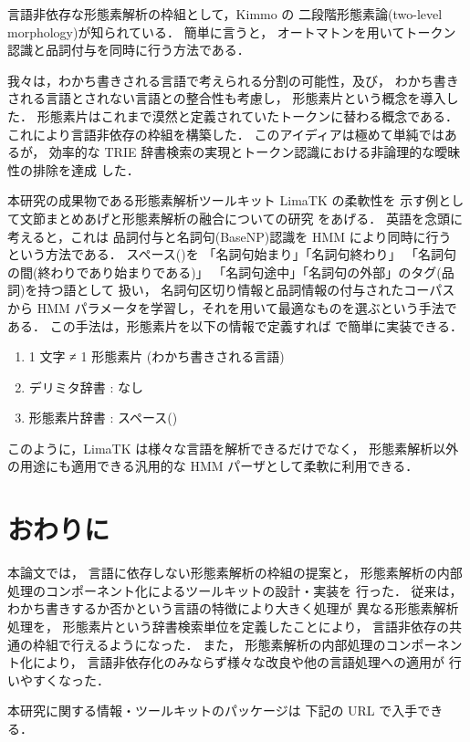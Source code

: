 言語非依存な形態素解析の枠組として，Kimmo の
二段階形態素論(two-level morphology)\cite{Kimmo83}が知られている．
簡単に言うと，
オートマトンを用いてトークン認識と品詞付与を同時に行う方法である．

我々は，わかち書きされる言語で考えられる分割の可能性，及び，
わかち書きされる言語とされない言語との整合性も考慮し，
形態素片という概念を導入した．
形態素片はこれまで漠然と定義されていたトークンに替わる概念である．
これにより言語非依存の枠組を構築した．
このアイディアは極めて単純ではあるが，
効率的な TRIE 辞書検索の実現とトークン認識における非論理的な曖昧性の排除を達成
した．

本研究の成果物である形態素解析ツールキット LimaTK の柔軟性を
示す例として文節まとめあげと形態素解析の融合についての研究\cite{浅原99}
をあげる．
英語を念頭に考えると，これは
品詞付与と名詞句(BaseNP)認識を HMM により同時に行う
という方法である．
スペース({\delimi})を
「名詞句始まり」「名詞句終わり」
「名詞句の間(終わりであり始まりである)」
「名詞句途中」「名詞句の外部」のタグ(品詞)を持つ語として
扱い，
名詞句区切り情報と品詞情報の付与されたコーパスから
HMM パラメータを学習し，それを用いて最適なものを選ぶという手法である．
この手法は，形態素片を以下の情報で定義すれば \moz で簡単に実装できる．
\begin{enumerate}
\item 1 文字 ≠ 1 形態素片 (わかち書きされる言語)
\item デリミタ辞書 : なし
\item 形態素片辞書 : スペース({\delimi})
\end{enumerate}
このように，LimaTK は様々な言語を解析できるだけでなく，
形態素解析以外の用途にも適用できる汎用的な
 HMM パーザとして柔軟に利用できる．


\section{おわりに}

本論文では，
言語に依存しない形態素解析の枠組の提案と，
形態素解析の内部処理のコンポーネント化によるツールキットの設計・実装を
行った．
従来は，わかち書きするか否かという言語の特徴により大きく処理が
異なる形態素解析処理を，
形態素片という辞書検索単位を定義したことにより，
言語非依存の共通の枠組で行えるようになった．
また，
形態素解析の内部処理のコンポーネント化により，
言語非依存化のみならず様々な改良や他の言語処理への適用が
行いやすくなった．

本研究に関する情報・ツールキットのパッケージは
下記の URL で入手できる．

